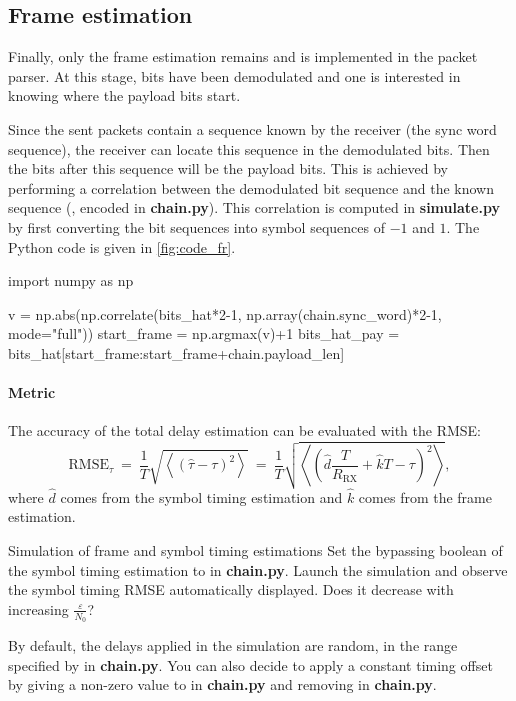 \subsection{Frame estimation}
Finally, only the frame estimation remains and is implemented in the packet parser. At this stage, bits have been demodulated and one is interested in knowing where the payload bits start.

Since the sent packets contain a sequence known by the receiver (the sync word sequence), the receiver can locate this sequence in the demodulated bits. Then the bits after this sequence will be the payload bits. This is achieved by performing a correlation between the demodulated bit sequence and the known sequence (, encoded in \textbf{chain.py}). This correlation is computed in \textbf{simulate.py} by first converting the bit sequences into symbol sequences of $-1$ and $1$. The Python code is given in \autoref{fig:code_fr}.
\begin{listing}[H]
\begin{python}
import numpy as np

v = np.abs(np.correlate(bits_hat*2-1, np.array(chain.sync_word)*2-1, mode="full"))
start_frame = np.argmax(v)+1
bits_hat_pay = bits_hat[start_frame:start_frame+chain.payload_len]

\end{python}
\caption{Python code for frame estimation (from \textbf{simulate.py}).}
\label{fig:code_fr}
\end{listing}

\paragraph{Metric} The accuracy of the total delay estimation can be evaluated with the RMSE:
\begin{equation*}
    \text{RMSE}_{\tau}\:=\:\frac{1}{T}\sqrt{\left\langle\left(\hat{\tau}-\tau\right)^2\right\rangle}\:=\:\frac{1}{T}\sqrt{\left\langle\left(\hat{d}\frac{T}{R_{\text{RX}}}+\hat{k}T-\tau\right)^2\right\rangle},
\end{equation*}
where $\hat{d}$ comes from the symbol timing estimation and $\hat{k}$ comes from the frame estimation.



\begin{bclogo}[couleur = gray!20, arrondi = 0.2, logo=\bccrayon]{Simulation of frame and symbol timing estimations}
Set the bypassing boolean of the symbol timing estimation to  in \textbf{chain.py}. Launch the simulation and observe the symbol timing RMSE automatically displayed. Does it decrease with increasing $\frac{\varepsilon}{N_0}$?

By default, the delays applied in the simulation are random, in the range specified by  in \textbf{chain.py}. You can also decide to apply a constant timing offset by giving a non-zero value to  in \textbf{chain.py} and removing  in \textbf{chain.py}.

\end{bclogo}
